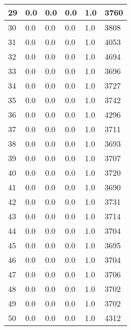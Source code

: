 \begin{longtable}{|l|l|l|l|l|l|}
29 & 0.0 & 0.0 & 0.0 & 1.0 & 3760 \\ \hline 
30 & 0.0 & 0.0 & 0.0 & 1.0 & 3808 \\ \hline 
31 & 0.0 & 0.0 & 0.0 & 1.0 & 4053 \\ \hline 
32 & 0.0 & 0.0 & 0.0 & 1.0 & 4694 \\ \hline 
33 & 0.0 & 0.0 & 0.0 & 1.0 & 3696 \\ \hline 
34 & 0.0 & 0.0 & 0.0 & 1.0 & 3727 \\ \hline 
35 & 0.0 & 0.0 & 0.0 & 1.0 & 3742 \\ \hline 
36 & 0.0 & 0.0 & 0.0 & 1.0 & 4296 \\ \hline 
37 & 0.0 & 0.0 & 0.0 & 1.0 & 3711 \\ \hline 
38 & 0.0 & 0.0 & 0.0 & 1.0 & 3693 \\ \hline 
39 & 0.0 & 0.0 & 0.0 & 1.0 & 3707 \\ \hline 
40 & 0.0 & 0.0 & 0.0 & 1.0 & 3720 \\ \hline 
41 & 0.0 & 0.0 & 0.0 & 1.0 & 3690 \\ \hline 
42 & 0.0 & 0.0 & 0.0 & 1.0 & 3731 \\ \hline 
43 & 0.0 & 0.0 & 0.0 & 1.0 & 3714 \\ \hline 
44 & 0.0 & 0.0 & 0.0 & 1.0 & 3704 \\ \hline 
45 & 0.0 & 0.0 & 0.0 & 1.0 & 3695 \\ \hline 
46 & 0.0 & 0.0 & 0.0 & 1.0 & 3704 \\ \hline 
47 & 0.0 & 0.0 & 0.0 & 1.0 & 3706 \\ \hline 
48 & 0.0 & 0.0 & 0.0 & 1.0 & 3702 \\ \hline 
49 & 0.0 & 0.0 & 0.0 & 1.0 & 3702 \\ \hline 
50 & 0.0 & 0.0 & 0.0 & 1.0 & 4312 \\ \hline 
\end{longtable}